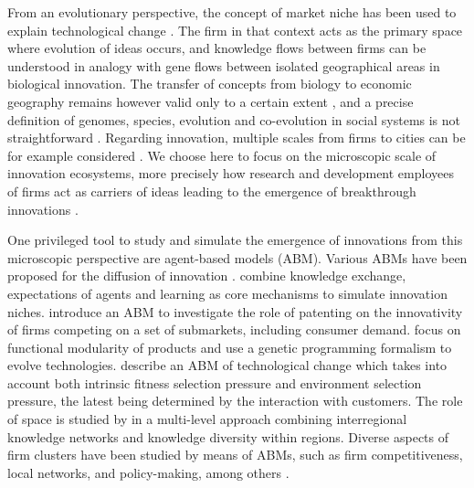 \documentclass[letterpaper]{article}
\begin{document}
From an evolutionary perspective, the concept of market niche has been used to explain technological change \citep{schot2007niches}. The firm in that context acts as the primary space where evolution of ideas occurs, and knowledge flows between firms can be understood in analogy with gene flows between isolated geographical areas in biological innovation. The transfer of concepts from biology to economic geography remains however valid only to a certain extent \citep{schamp2010notion}, and a precise definition of genomes, species, evolution and co-evolution in social systems is not straightforward \citep{raimbault2019modeling}. Regarding innovation, multiple scales from firms to cities can be for example considered \citep{raimbault2020model}. We choose here to focus on the microscopic scale of innovation ecosystems, more precisely how research and development employees of firms act as carriers of ideas leading to the emergence of breakthrough innovations \citep{song2016innovation}.

One privileged tool to study and simulate the emergence of innovations from this microscopic perspective are agent-based models (ABM). Various ABMs have been proposed for the diffusion of innovation \citep{kiesling2012agent}. \cite{lopolito2013emerging} combine knowledge exchange, expectations of agents and learning as core mechanisms to simulate innovation niches. \cite{dosi2021patents} introduce an ABM to investigate the role of patenting on the innovativity of firms competing on a set of submarkets, including consumer demand. \cite{chen2006functional} focus on functional modularity of products and use a genetic programming formalism to evolve technologies. \cite{ma2005agent} describe an ABM of technological change which takes into account both intrinsic fitness selection pressure and environment selection pressure, the latest being determined by the interaction with customers. The role of space is studied by \cite{vermeulen2018role} in a multi-level approach combining interregional knowledge networks and knowledge diversity within regions. Diverse aspects of firm clusters have been studied by means of ABMs, such as firm competitiveness, local networks, and policy-making, among others \citep{fioretti2005agent}.
\end{document}

